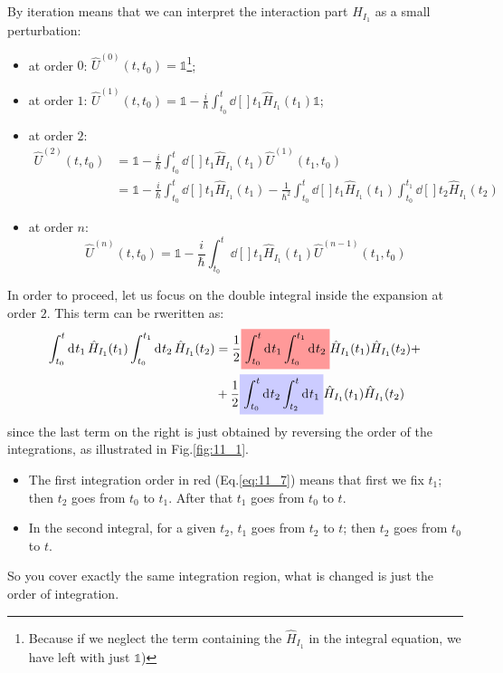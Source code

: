 \documentclass[../main/main.tex]{subfiles}
\begin{document}
By iteration means that we can interpret the interaction part \( \hat{H}_{I_1}  \) as a small perturbation:
\begin{itemize}
\item at order \( 0 \): \( \hat{U}^{(0)} (t,t_0) = \mathbb{1}  \)\footnote{Because if we neglect the term containing the \(\hat{H}_{I_1}\) in the integral equation, we have left with just \( \mathbb{1} \))};
\item at order \( 1 \): \( \hat{U}^{(1)} (t,t_0) = \mathbb{1} - \frac{i}{\hbar } \int_{t_0}^{t} \dd[]{t_1} \hat{H}_{I_1} (t_1) \mathbb{1}    \);
\item at order \( 2 \):
\begin{equation*}
\begin{split}
  \hat{U}^{(2)} (t,t_0) &= \mathbb{1} - \frac{i}{\hbar } \int_{t_0}^{t} \dd[]{t_1} \hat{H}_{I_1} (t_1) \hat{U}^{(1)} (t_1,t_0) \\
  &= \mathbb{1} - \frac{i}{\hbar } \int_{t_0}^{t} \dd[]{t_1} \hat{H}_{I_1} (t_1)
  -\frac{1}{\hbar^2 } \int_{t_0}^{t} \dd[]{t_1} \hat{H}_{I_1} (t_1) \int_{t_0}^{t_1} \dd[]{t_2} \hat{H}_{I_1} (t_2)
\end{split}
\end{equation*}
\item at order \( n \):
\begin{equation}
  \hat{U}^{(n)} (t,t_0) = \mathbb{1} - \frac{i}{\hbar } \int_{t_0}^{t} \dd[]{t_1} \hat{H}_{I_1} (t_1) \hat{U}^{(n-1)} (t_1,t_0)
\end{equation}
\end{itemize}

In order to proceed, let us focus on the double integral inside the expansion at order \( 2 \). This term can be rweritten as:
\begin{equation}
\begin{split}
  \int_{t_0}^{t} \dd[]{t_1} \hat{H}_{I_1} (t_1) \int_{t_0}^{t_1} \dd[]{t_2} \hat{H}_{I_1} (t_2) &=
  \frac{1}{2} \mathcolorbox{red!40}{\int_{t_0}^{t} \dd[]{t_1} \int_{t_0}^{t_1} \dd[]{t_2}} \hat{H}_{I_1} (t_1)  \hat{H}_{I_1} (t_2) +  \\
  &+ \frac{1}{2}  \mathcolorbox{blue!20}{ \int_{t_0}^{t} \dd[]{t_2} \int_{t_2}^{t} \dd[]{t_1}}  \hat{H}_{I_1}(t_1) \hat{H}_{I_1} (t_2)
\end{split}
\label{eq:11_7}
\end{equation}
since the last term on the right is just obtained by reversing the order of the integrations, as illustrated in Fig.\ref{fig:11_1}.
\begin{itemize}
\item The first integration order in red (Eq.\eqref{eq:11_7}) means that first we fix \( t_1 \); then \( t_2 \) goes from \( t_0 \) to \( t_1 \). After that \( t_1 \) goes from \( t_0 \) to \( t \).
\item In the second integral, for a given \( t_2 \), \( t_1 \) goes from \( t_2 \) to \( t \); then \( t_2 \) goes from \( t_0 \) to \( t \).
\end{itemize}
So you cover exactly the same integration region, what is changed is just the order of integration.
\end{document}
